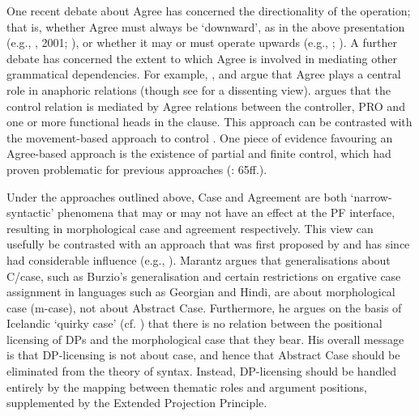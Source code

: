 \documentclass[output=paper]{langsci/langscibook}
\begin{document}
One recent debate about Agree has concerned the directionality of the operation; that is, whether Agree must always be ‘downward’, as in the above presentation (e.g., \citealt{Chomsky2000}, 2001; \citealt{Preminger2013}), or whether it may or must operate upwards (e.g., \citealt{Zeijlstra2012}; \citealt{Ackema2018}). A further debate has concerned the extent to which Agree is involved in mediating other grammatical dependencies. For example, \citet{Reuland2001}, \citet{Hicks2009} and \citet{Rooryck2011} argue that Agree plays a central role in anaphoric relations (though see \citealt{Safir2014} for a dissenting view). \citet{Landau2000} argues that the control relation is mediated by Agree relations between the controller, PRO and one or more functional heads in the clause. This approach can be contrasted with the movement-based approach to control \citep{Hornstein1999,Hornstein2010}. One piece of evidence favouring an Agree-based approach is the existence of partial and finite control, which had proven problematic for previous approaches (\citealt{Landau2013}: 65ff.).

Under the approaches outlined above, Case and Agreement are both ‘narrow-syntactic’ phenomena that may or may not have an effect at the PF interface, resulting in morphological case and agreement respectively. This view can usefully be contrasted with an approach that was first proposed by \citet{Marantz1991} and has since had considerable influence (e.g., \citealt{Harley1995,Schütze1997,McFadden2004,Bobaljik2008,Baker2010,Titov2012}). Marantz argues that generalisations about C/case, such as Burzio’s generalisation \citep{Burzio1986} and certain restrictions on ergative case assignment in languages such as Georgian and Hindi, are about morphological case (m-case), not about Abstract Case. Furthermore, he argues on the basis of Icelandic ‘quirky case’ (cf. \citealt{Zaenen1985}) that there is no relation between the positional licensing of DPs and the morphological case that they bear. His overall message is that DP-licensing is not about case, and hence that Abstract Case should be eliminated from the theory of syntax. Instead, DP-licensing should be handled entirely by the mapping between thematic roles and argument positions, supplemented by the Extended Projection Principle.
\end{document}
